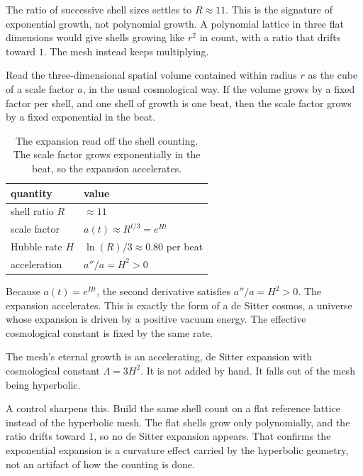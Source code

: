 The ratio of successive shell sizes settles to $R \approx 11$. This is the signature of exponential growth, not polynomial growth. A polynomial lattice in three flat dimensions would give shells growing like $r^2$ in count, with a ratio that drifts toward $1$. The mesh instead keeps multiplying.

Read the three-dimensional spatial volume contained within radius $r$ as the cube of a scale factor $a$, in the usual cosmological way. If the volume grows by a fixed factor per shell, and one shell of growth is one beat, then the scale factor grows by a fixed exponential in the beat.

\begin{table}[ht]
\centering
\begin{tabular}{@{}ll@{}}
\toprule
quantity & value \\
\midrule
shell ratio $R$ & $\approx 11$ \\
scale factor & $a(t) \approx R^{t/3} = e^{H t}$ \\
Hubble rate $H$ & $\ln(R)/3 \approx 0.80$ per beat \\
acceleration & $a''/a = H^2 > 0$ \\
\bottomrule
\end{tabular}
\caption{The expansion read off the shell counting. The scale factor grows exponentially in the beat, so the expansion accelerates.}
\label{tab:expansion-law}
\end{table}

Because $a(t) = e^{Ht}$, the second derivative satisfies $a''/a = H^2 > 0$. The expansion accelerates. This is exactly the form of a de Sitter cosmos, a universe whose expansion is driven by a positive vacuum energy. The effective cosmological constant is fixed by the same rate.

\begin{result}
The mesh's eternal growth is an accelerating, de Sitter expansion with cosmological constant $\Lambda = 3 H^2$. It is not added by hand. It falls out of the mesh being hyperbolic.
\end{result}

A control sharpens this. Build the same shell count on a flat reference lattice instead of the hyperbolic mesh. The flat shells grow only polynomially, and the ratio drifts toward $1$, so no de Sitter expansion appears. That confirms the exponential expansion is a curvature effect carried by the hyperbolic geometry, not an artifact of how the counting is done.

